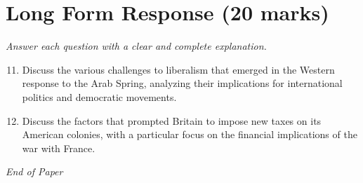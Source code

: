 \documentclass[12pt]{article}
\begin{document}
\section*{Long Form Response (20 marks)}
\textit{Answer each question with a clear and complete explanation.}
\begin{enumerate}[label=\arabic*.]
\setcounter{enumi}{10}
\item Discuss the various challenges to liberalism that emerged in the Western response to the Arab Spring, analyzing their implications for international politics and democratic movements.
\item Discuss the factors that prompted Britain to impose new taxes on its American colonies, with a particular focus on the financial implications of the war with France.
\end{enumerate}

\vfill
\noindent\textit{End of Paper}
\end{document}
